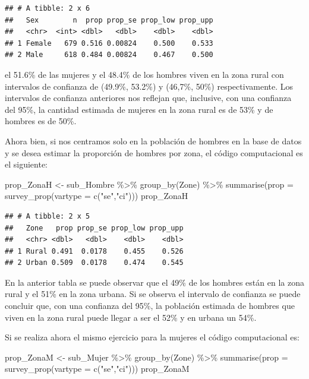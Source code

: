 \documentclass[
  12pt,
]{book}
\newenvironment{Shaded}{\begin{snugshade}}{\end{snugshade}}
\newcommand{\AttributeTok}[1]{\textcolor[rgb]{0.77,0.63,0.00}{#1}}
\newcommand{\FunctionTok}[1]{\textcolor[rgb]{0.00,0.00,0.00}{#1}}
\newcommand{\NormalTok}[1]{#1}
\newcommand{\OtherTok}[1]{\textcolor[rgb]{0.56,0.35,0.01}{#1}}
\newcommand{\SpecialCharTok}[1]{\textcolor[rgb]{0.00,0.00,0.00}{#1}}
\newcommand{\StringTok}[1]{\textcolor[rgb]{0.31,0.60,0.02}{#1}}
\begin{document}
\begin{verbatim}
## # A tibble: 2 x 6
##   Sex        n  prop prop_se prop_low prop_upp
##   <chr>  <int> <dbl>   <dbl>    <dbl>    <dbl>
## 1 Female   679 0.516 0.00824    0.500    0.533
## 2 Male     618 0.484 0.00824    0.467    0.500
\end{verbatim}

el 51.6\% de las mujeres y el 48.4\% de los hombres viven en la zona rural con intervalos de confianza de (49.9\%, 53.2\%) y (46,7\%, 50\%) respectivamente. Los intervalos de confianza anteriores nos reflejan que, inclusive, con una confianza del 95\%, la cantidad estimada de mujeres en la zona rural es de 53\% y de hombres es de 50\%.

Ahora bien, si nos centramos solo en la población de hombres en la base de datos y se desea estimar la proporción de hombres por zona, el código computacional es el siguiente:

\begin{Shaded}
\begin{Highlighting}[]
\NormalTok{prop\_ZonaH }\OtherTok{\textless{}{-}}\NormalTok{ sub\_Hombre }\SpecialCharTok{\%\textgreater{}\%} \FunctionTok{group\_by}\NormalTok{(Zone) }\SpecialCharTok{\%\textgreater{}\%} 
              \FunctionTok{summarise}\NormalTok{(}\AttributeTok{prop =} \FunctionTok{survey\_prop}\NormalTok{(}\AttributeTok{vartype =} \FunctionTok{c}\NormalTok{(}\StringTok{"se"}\NormalTok{,}\StringTok{"ci"}\NormalTok{)))}
\NormalTok{prop\_ZonaH}
\end{Highlighting}
\end{Shaded}

\begin{verbatim}
## # A tibble: 2 x 5
##   Zone   prop prop_se prop_low prop_upp
##   <chr> <dbl>   <dbl>    <dbl>    <dbl>
## 1 Rural 0.491  0.0178    0.455    0.526
## 2 Urban 0.509  0.0178    0.474    0.545
\end{verbatim}

En la anterior tabla se puede observar que el 49\% de los hombres están en la zona rural y el 51\% en la zona urbana. Si se observa el intervalo de confianza se puede concluir que, con una confianza del 95\%, la población estimada de hombres que viven en la zona rural puede llegar a ser el 52\% y en urbana un 54\%.

Si se realiza ahora el mismo ejercicio para la mujeres el código computacional es:

\begin{Shaded}
\begin{Highlighting}[]
\NormalTok{prop\_ZonaM }\OtherTok{\textless{}{-}}\NormalTok{ sub\_Mujer }\SpecialCharTok{\%\textgreater{}\%} \FunctionTok{group\_by}\NormalTok{(Zone) }\SpecialCharTok{\%\textgreater{}\%} 
              \FunctionTok{summarise}\NormalTok{(}\AttributeTok{prop =} \FunctionTok{survey\_prop}\NormalTok{(}\AttributeTok{vartype =} \FunctionTok{c}\NormalTok{(}\StringTok{"se"}\NormalTok{,}\StringTok{"ci"}\NormalTok{)))}
\NormalTok{prop\_ZonaM}
\end{Highlighting}
\end{Shaded}
\end{document}
